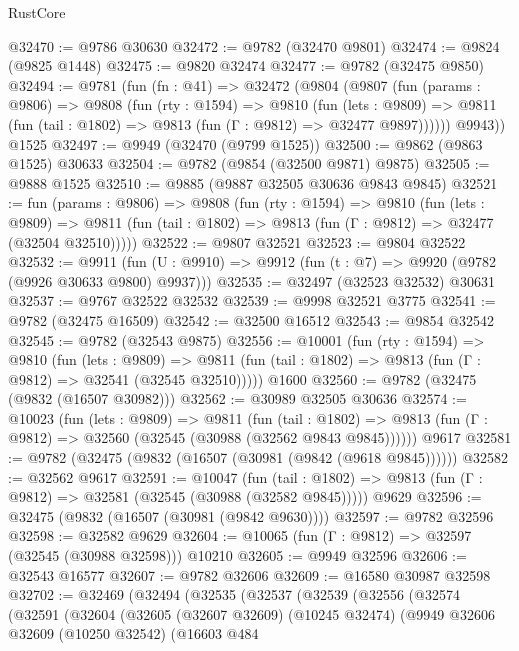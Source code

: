 \begin{lexlean}{RustCore}
\begin{coremodule}
@32470 := @9786 @30630
@32472 := @9782 (@32470 @9801)
@32474 := @9824 (@9825 @1448)
@32475 := @9820 @32474
@32477 := @9782 (@32475 @9850)
@32494 := @9781
    (fun (fn : @41) =>
    @32472
      (@9804
        (@9807
          (fun (params : @9806) =>
          @9808
            (fun (rty : @1594) =>
            @9810
              (fun (lets : @9809) =>
              @9811 (fun (tail : @1802) => @9813 (fun (Γ : @9812) => @32477 @9897))))))
        @9943))
    @1525
@32497 := @9949 (@32470 (@9799 @1525))
@32500 := @9862 (@9863 @1525) @30633
@32504 := @9782 (@9854 (@32500 @9871) @9875)
@32505 := @9888 @1525
@32510 := @9885 (@9887 @32505 @30636 @9843 @9845)
@32521 := fun (params : @9806) =>
  @9808
    (fun (rty : @1594) =>
    @9810
      (fun (lets : @9809) =>
      @9811 (fun (tail : @1802) => @9813 (fun (Γ : @9812) => @32477 (@32504 @32510)))))
@32522 := @9807 @32521
@32523 := @9804 @32522
@32532 := @9911
    (fun (U : @9910) => @9912 (fun (t : @7) => @9920 (@9782 (@9926 @30633 @9800) @9937)))
@32535 := @32497 (@32523 @32532) @30631
@32537 := @9767 @32522 @32532
@32539 := @9998 @32521 @3775
@32541 := @9782 (@32475 @16509)
@32542 := @32500 @16512
@32543 := @9854 @32542
@32545 := @9782 (@32543 @9875)
@32556 := @10001
    (fun (rty : @1594) =>
    @9810
      (fun (lets : @9809) =>
      @9811 (fun (tail : @1802) => @9813 (fun (Γ : @9812) => @32541 (@32545 @32510)))))
    @1600
@32560 := @9782 (@32475 (@9832 (@16507 @30982)))
@32562 := @30989 @32505 @30636
@32574 := @10023
    (fun (lets : @9809) =>
    @9811
      (fun (tail : @1802) =>
      @9813 (fun (Γ : @9812) => @32560 (@32545 (@30988 (@32562 @9843 @9845))))))
    @9617
@32581 := @9782 (@32475 (@9832 (@16507 (@30981 (@9842 (@9618 @9845))))))
@32582 := @32562 @9617
@32591 := @10047
    (fun (tail : @1802) => @9813 (fun (Γ : @9812) => @32581 (@32545 (@30988 (@32582 @9845)))))
    @9629
@32596 := @32475 (@9832 (@16507 (@30981 (@9842 @9630))))
@32597 := @9782 @32596
@32598 := @32582 @9629
@32604 := @10065 (fun (Γ : @9812) => @32597 (@32545 (@30988 @32598))) @10210
@32605 := @9949 @32596
@32606 := @32543 @16577
@32607 := @9782 @32606
@32609 := @16580 @30987 @32598
@32702 := @32469
    (@32494
      (@32535
        (@32537
          (@32539
            (@32556
              (@32574
                (@32591
                  (@32604
                    (@32605
                      (@32607 @32609)
                      (@10245 @32474)
                      (@9949
                        @32606
                        @32609
                        (@10250 @32542)
                        (@16603
                          @484

\end{coremodule}
\end{lexlean}
